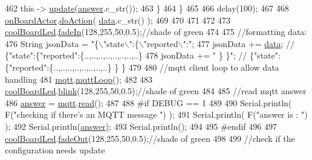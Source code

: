 \begin{DoxyCode}
462             \textcolor{keyword}{this} -> \hyperlink{class_cool_board_a8612756d3f73198cdde857a66f0fe690}{update}(\hyperlink{class_cool_board_a7b835fafd449e5282f7f91d787a2dc15}{answer}.c\_str());
463         \}
464     \}
465 
466     delay(100);
467 
468     \hyperlink{class_cool_board_a4ac693895c21025b8808653f2a4316e6}{onBoardActor}.\hyperlink{class_cool_board_actor_a96a45658d32c6b95caa2f385c7da32cd}{doAction}( \hyperlink{class_cool_board_a427fb753dd8575bdf821c70a5c63d695}{data}.c\_str() );  
469 
470 
471 
472     
473     \hyperlink{class_cool_board_a1b1d3c684a5baa56b08486e192fd8e97}{coolBoardLed}.\hyperlink{class_cool_board_led_ab778f5e7bed0ab74e3906d82110493c3}{fadeIn}(128,255,50,0.5);\textcolor{comment}{//shade of green}
474 
475     \textcolor{comment}{//formatting data:}
476     String jsonData = \textcolor{stringliteral}{"\{\(\backslash\)"state\(\backslash\)":\{\(\backslash\)"reported\(\backslash\)":"};
477     jsonData += \hyperlink{class_cool_board_a427fb753dd8575bdf821c70a5c63d695}{data}; \textcolor{comment}{// \{"state":\{"reported":\{..,..,..,..,..,..,..,..\}}
478     jsonData += \textcolor{stringliteral}{" \} \}"}; \textcolor{comment}{// \{"state":\{"reported":\{..,..,..,..,..,..,..,..\}  \} \}}
479     
480     \textcolor{comment}{//mqtt client loop to allow data handling}
481     \hyperlink{class_cool_board_a2399f44d7c23c1149a335cb3b46d90f1}{mqtt}.\hyperlink{class_cool_m_q_t_t_aa5eaae967b562b62cbcf2b8d81f6e5d5}{mqttLoop}();
482 
483     \hyperlink{class_cool_board_a1b1d3c684a5baa56b08486e192fd8e97}{coolBoardLed}.\hyperlink{class_cool_board_led_a96e1ea13003eee34c9dbcef340404426}{blink}(128,255,50,0.5);\textcolor{comment}{//shade of green    }
484 
485     \textcolor{comment}{//read mqtt answer}
486     \hyperlink{class_cool_board_a7b835fafd449e5282f7f91d787a2dc15}{answer} = \hyperlink{class_cool_board_a2399f44d7c23c1149a335cb3b46d90f1}{mqtt}.\hyperlink{class_cool_m_q_t_t_ae3c18f6ae9723746d32765f1c8f176ca}{read}();
487 
488 \textcolor{preprocessor}{#if DEBUG == 1 }
489 
490     Serial.println( F(\textcolor{stringliteral}{"checking if there's an MQTT message "})  );
491     Serial.println( F(\textcolor{stringliteral}{"answer is : "}) );    
492     Serial.println(\hyperlink{class_cool_board_a7b835fafd449e5282f7f91d787a2dc15}{answer});   
493     Serial.println();
494 
495 \textcolor{preprocessor}{#endif  }
496 
497     \hyperlink{class_cool_board_a1b1d3c684a5baa56b08486e192fd8e97}{coolBoardLed}.\hyperlink{class_cool_board_led_a93d545679237e8cc858324367149775c}{fadeOut}(128,255,50,0.5);\textcolor{comment}{//shade of green    }
498 
499     \textcolor{comment}{//check if the configuration needs update }

\end{DoxyCode}
